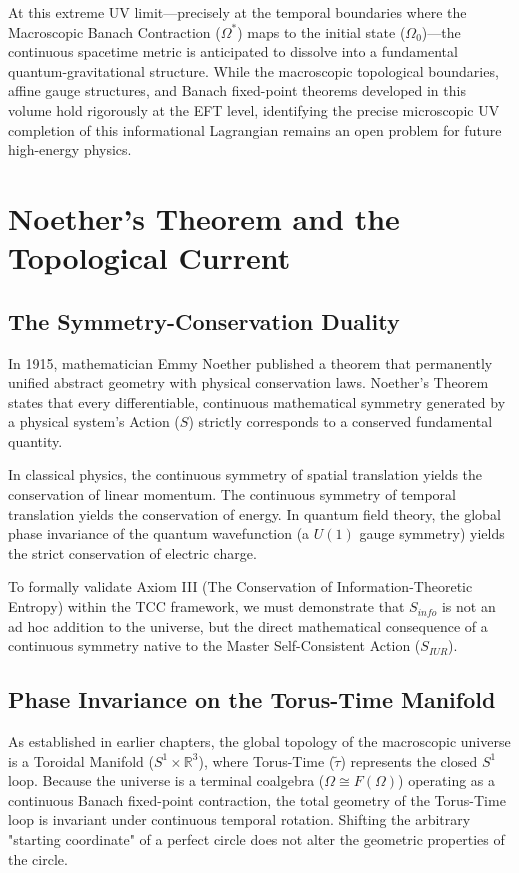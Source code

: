 \documentclass[12pt,openany]{book}
\theoremstyle{plain}
\theoremstyle{definition}
\theoremstyle{remark}
\begin{document}
At this extreme UV limit---precisely at the temporal boundaries where the Macroscopic Banach Contraction ($\Omega^*$) maps to the initial state ($\Omega_0$)---the continuous spacetime metric is anticipated to dissolve into a fundamental quantum-gravitational structure. While the macroscopic topological boundaries, affine gauge structures, and Banach fixed-point theorems developed in this volume hold rigorously at the EFT level, identifying the precise microscopic UV completion of this informational Lagrangian remains an open problem for future high-energy physics.

\chapter{Noether's Theorem and the Topological Current}

\section{The Symmetry-Conservation Duality}

In 1915, mathematician Emmy Noether published a theorem that permanently unified abstract geometry with physical conservation laws. Noether's Theorem states that every differentiable, continuous mathematical symmetry generated by a physical system's Action ($S$) strictly corresponds to a conserved fundamental quantity. 

In classical physics, the continuous symmetry of spatial translation yields the conservation of linear momentum. The continuous symmetry of temporal translation yields the conservation of energy. In quantum field theory, the global phase invariance of the quantum wavefunction (a $U(1)$ gauge symmetry) yields the strict conservation of electric charge.

To formally validate Axiom III (The Conservation of Information-Theoretic Entropy) within the TCC framework, we must demonstrate that $S_{info}$ is not an ad hoc addition to the universe, but the direct mathematical consequence of a continuous symmetry native to the Master Self-Consistent Action ($S_{IUR}$).

\section{Phase Invariance on the Torus-Time Manifold}

As established in earlier chapters, the global topology of the macroscopic universe is a Toroidal Manifold ($S^1 \times \mathbb{R}^3$), where Torus-Time ($\tilde{\tau}$) represents the closed $S^1$ loop. Because the universe is a terminal coalgebra ($\Omega \cong F(\Omega)$) operating as a continuous Banach fixed-point contraction, the total geometry of the Torus-Time loop is invariant under continuous temporal rotation. Shifting the arbitrary "starting coordinate" of a perfect circle does not alter the geometric properties of the circle.
\end{document}
